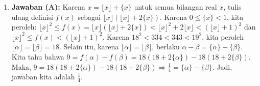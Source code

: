 \documentclass[12pt]{scrartcl}
\begin{document}
\begin{enumerate}
\item \textbf{Jawaban (A):} Karena $x=\lfloor x\rfloor+\{x\}$ untuk semua bilangan real $x$, tulis ulang definisi $f(x)$ sebagai $\lfloor x\rfloor(\lfloor x\rfloor+2\{x\})$. Karena $0\le\{x\}<1$, kita peroleh: $\lfloor x\rfloor^{2}\le f(x)=\lfloor x\rfloor(\lfloor x\rfloor+2\{x\})<\lfloor x\rfloor^{2}+2\lfloor x\rfloor<(\lfloor x\rfloor+1)^{2}$ dan $\lfloor x\rfloor^{2}\le f(x)<(\lfloor x\rfloor+1)^{2}$. Karena $18^{2}<334<343<19^{2}$, kita peroleh $\lfloor\alpha\rfloor=\lfloor\beta\rfloor=18$. Selain itu, karena $\lfloor\alpha\rfloor=\lfloor\beta\rfloor$, berlaku $\alpha-\beta=\{\alpha\}-\{\beta\}$. Kita tahu bahwa $9=f(\alpha)-f(\beta)=18(18+2\{\alpha\})-18(18+2\{\beta\})$. Maka, $9=18(18+2\{\alpha\})-18(18+2\{\beta\})\Rightarrow\frac{1}{4}=\{\alpha\}-\{\beta\}$. Jadi, jawaban kita adalah $\frac{1}{4}$.
\end{enumerate}
\end{document}
